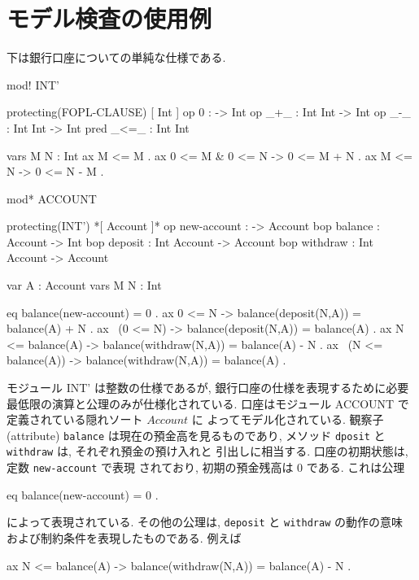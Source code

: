 \newpage
\section{モデル検査の使用例}
\label{sec:model-check-example}

下は銀行口座についての単純な仕様である.
\begin{vvtm}
\begin{simplev}
mod! INT' {
  protecting(FOPL-CLAUSE)
  [ Int ]
  op 0 : -> Int
  op _+_ : Int Int -> Int
  op _-_ : Int Int -> Int
  pred _<=_ : Int Int

  vars M N : Int
  ax M <= M .
  ax 0 <= M & 0 <= N -> 0 <= M + N .
  ax M <= N -> 0 <= N - M .
}

mod* ACCOUNT {
  protecting(INT')
  *[ Account ]*
  op new-account : -> Account
  bop balance : Account -> Int
  bop deposit : Int Account -> Account
  bop withdraw : Int Account -> Account

  var A : Account    vars M N : Int

  eq balance(new-account) = 0 .
  ax 0 <= N -> balance(deposit(N,A)) = balance(A) + N .
  ax ~(0 <= N) -> balance(deposit(N,A)) = balance(A) .
  ax N <= balance(A) -> balance(withdraw(N,A)) = balance(A) - N .
  ax ~(N <= balance(A)) -> balance(withdraw(N,A)) = balance(A) .

}
\end{simplev}
\end{vvtm}

モジュール INT' は整数の仕様であるが, 
銀行口座の仕様を表現するために必要最低限の演算と公理のみが仕様化されている.
口座はモジュール ACCOUNT で定義されている隠れソート $Account$ に
よってモデル化されている. 
観察子(attribute) \texttt{balance} は現在の預金高を見るものであり,
メソッド \texttt{dposit} と \texttt{withdraw} は, それぞれ預金の預け入れと
引出しに相当する. 口座の初期状態は, 定数 \texttt{new-account} で表現
されており, 初期の預金残高は 0 である. これは公理

\begin{vvtm}
\begin{simplev}
   eq balance(new-account) = 0 .
 \end{simplev}
\end{vvtm}

によって表現されている.
その他の公理は, \texttt{deposit} と \texttt{withdraw} の動作の意味
および制約条件を表現したものである.
例えば

\begin{vvtm}
\begin{simplev}
  ax N <= balance(A) -> balance(withdraw(N,A)) = balance(A) - N .
\end{simplev}
\end{vvtm}

